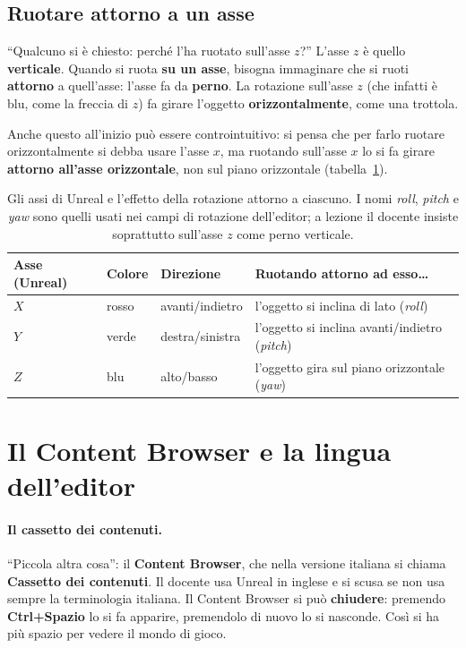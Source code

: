 \subsection{Ruotare attorno a un asse}

``Qualcuno si è chiesto: perché l'ha ruotato sull'asse $z$?'' L'asse $z$ è
quello \textbf{verticale}. Quando si ruota \textbf{su un asse}, bisogna
immaginare che si ruoti \textbf{attorno} a quell'asse: l'asse fa da
\textbf{perno}. La rotazione sull'asse $z$ (che infatti è blu, come la freccia
di $z$) fa girare l'oggetto \textbf{orizzontalmente}, come una trottola.

Anche questo all'inizio può essere controintuitivo: si pensa che per farlo
ruotare orizzontalmente si debba usare l'asse $x$, ma ruotando sull'asse $x$ lo
si fa girare \textbf{attorno all'asse orizzontale}, non sul piano orizzontale
(tabella~\ref{gd11:tab:assi}).

\begin{table}[htbp]
\centering
\small
\begin{tabular}{@{}llll@{}}
\toprule
\textbf{Asse (Unreal)} & \textbf{Colore} & \textbf{Direzione} & \textbf{Ruotando attorno ad esso\ldots} \\
\midrule
$X$ & rosso & avanti/indietro & l'oggetto si inclina di lato (\emph{roll}) \\
$Y$ & verde & destra/sinistra & l'oggetto si inclina avanti/indietro (\emph{pitch}) \\
$Z$ & blu & alto/basso & l'oggetto gira sul piano orizzontale (\emph{yaw}) \\
\bottomrule
\end{tabular}
\caption{Gli assi di Unreal e l'effetto della rotazione attorno a ciascuno. I
nomi \emph{roll}, \emph{pitch} e \emph{yaw} sono quelli usati nei campi di
rotazione dell'editor; a lezione il docente insiste soprattutto sull'asse $z$
come perno verticale.}
\label{gd11:tab:assi}
\end{table}

\section{Il Content Browser e la lingua dell'editor}
\label{gd11:sec:browser}

\paragraph{Il cassetto dei contenuti.} ``Piccola altra cosa'': il
\textbf{Content Browser}, che nella versione italiana si chiama
\textbf{Cassetto dei contenuti}. Il docente usa Unreal in inglese e si scusa se
non usa sempre la terminologia italiana. Il Content Browser si può
\textbf{chiudere}: premendo \textbf{Ctrl+Spazio} lo si fa apparire, premendolo
di nuovo lo si nasconde. Così si ha più spazio per vedere il mondo di gioco.

